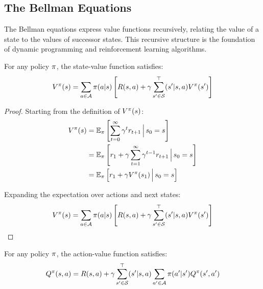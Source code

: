 \subsection{The Bellman Equations}

The Bellman equations express value functions recursively, relating the value of a state to the values of successor states. This recursive structure is the foundation of dynamic programming and reinforcement learning algorithms.

\begin{theorem}
For any policy $\pi$, the state-value function satisfies:
\begin{equation}
V^\pi(s) = \sum_{a \in \mathcal{A}} \pi(a|s) \left[ R(s,a) + \gamma \sum_{s' \in \mathcal{S}} ^\top(s'|s,a) V^\pi(s') \right]
\label{eq:bellman_v}
\end{equation}
\end{theorem}

\begin{proof}
Starting from the definition of $V^\pi(s)$:
\begin{align}
V^\pi(s) &= \mathbb{E}_\pi \left[ \sum_{t=0}^{\infty} \gamma^t r_{t+1} \,\Big|\, s_0 = s \right] \\
&= \mathbb{E}_\pi \left[ r_1 + \gamma \sum_{t=1}^{\infty} \gamma^{t-1} r_{t+1} \,\Big|\, s_0 = s \right] \\
&= \mathbb{E}_\pi \left[ r_1 + \gamma V^\pi(s_1) \,\Big|\, s_0 = s \right]
\end{align}

Expanding the expectation over actions and next states:
\begin{equation}
V^\pi(s) = \sum_{a \in \mathcal{A}} \pi(a|s) \left[ R(s,a) + \gamma \sum_{s' \in \mathcal{S}} ^\top(s'|s,a) V^\pi(s') \right]
\end{equation}
\end{proof}

\begin{theorem}
For any policy $\pi$, the action-value function satisfies:
\begin{equation}
Q^\pi(s, a) = R(s,a) + \gamma \sum_{s' \in \mathcal{S}} ^\top(s'|s,a) \sum_{a' \in \mathcal{A}} \pi(a'|s') Q^\pi(s', a')
\label{eq:bellman_q}
\end{equation}
\end{theorem}

